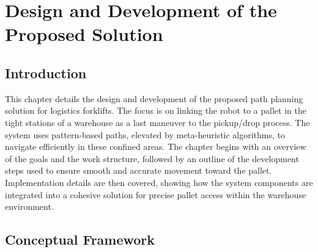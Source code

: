 \chapter{Design and Development of the
Proposed Solution
}

\renewcommand{\chaptername}{Chapter}
\section*{Introduction}

This chapter details the design and development of the proposed path planning solution for logistics forklifts. 
The focus is on linking the robot to a pallet in the tight stations of a warehouse as a last maneuver to the 
pickup/drop process. The system uses pattern-based paths, elevated by meta-heuristic algorithms, to navigate 
efficiently in these confined areas. 
The chapter begins with 
an overview of the goals and the work structure, followed by an outline of the development steps used to ensure 
smooth and accurate movement toward the pallet. Implementation details are then covered, showing how the system 
components are integrated into a cohesive solution for precise pallet access within the warehouse environment.

\section{Conceptual Framework}
